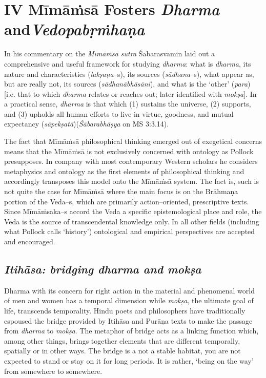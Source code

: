 \section*{IV Mīmāṁsā Fosters \textit{Dharma} and\hfill \break \textit{Vedopabṛṁhaṇa}}

In his commentary on the \textit{Mīmāṁsā sūtra} Śabarasvāmin laid out a comprehensive and useful framework for studying \textit{dharma}: what is \textit{dharma}, its nature and characteristics (\textit{lakṣaṇa–}s), its sources (\textit{sādhana–}s), what appear as, but are really not, its sources (\textit{sādhanābhāsāni}), and what is the ‘other’ (\textit{para}) [i.e. that to which \textit{dharma} relates or reaches out; later identified with \textit{mokṣa}]. In a practical sense, \textit{dharma} is that which (1) sustains the universe, (2) supports, and (3) upholds all human efforts to live in virtue, goodness, and mutual expectancy (\textit{sāpekṣatā})(\textit{Śābarabhāṣya} on MS 3:3.14).

The fact that Mīmāṁsā philosophical thinking emerged out of exegetical concerns means that the Mīmāṁsā is not exclusively concerned with ontology as Pollock presupposes. In company with most contemporary Western scholars he considers metaphysics and ontology as the first elements of philosophical thinking and accordingly transposes this model onto the Mīmāṁsā system. The fact is, such is not quite the case for Mīmāṁsā where the main focus is on the Brāhmaṇa portion of the Veda–s, which are primarily action–oriented, prescriptive texts. Since Mīmāṁsaka–s accord the Veda a specific epistemological place and role, the Veda is the source of transcendental knowledge only. In all other fields (including what Pollock calls ‘history’) ontological and empirical perspectives are accepted and encouraged.

\subsection*{\textit{Itihāsa: bridging dharma and mokṣa}}

Dharma with its concern for right action in the material and phenomenal world of men and women has a temporal dimension while \textit{mokṣa}, the ultimate goal of life, transcends temporality. Hindu poets and philosophers have traditionally espoused the bridge provided by Itihāsa and Purāṇa texts to make the passage from \textit{dharma} to \textit{mokṣa}. The metaphor of bridge acts as a linking function which, among other things, brings together elements that are different temporally, spatially or in other ways. The bridge is a not a stable habitat, you are not expected to stand or stay on it for long periods. It is rather, ‘being on the way’ from somewhere to somewhere.

